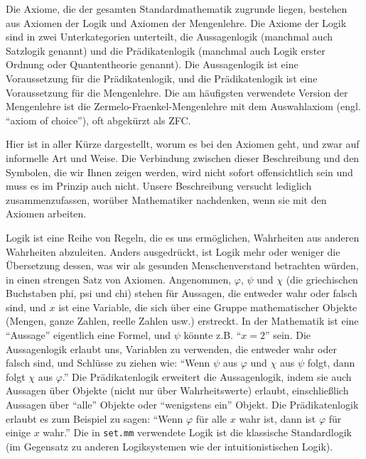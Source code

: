 Die Axiome, die der gesamten Standardmathematik zugrunde liegen, bestehen aus Axiomen der Logik und Axiomen der Mengenlehre. Die Axiome der Logik sind in zwei Unterkategorien unterteilt, die Aussagenlogik (manchmal auch Satzlogik genannt) und die Prädikatenlogik (manchmal auch Logik erster Ordnung oder Quantentheorie genannt).  Die Aussagenlogik ist eine Voraussetzung für die Prädikatenlogik, und die Prädikatenlogik ist eine Voraussetzung für die Mengenlehre.  Die am häufigsten verwendete Version der Mengenlehre ist die Zermelo-Fraenkel-Mengenlehre mit dem Auswahlaxiom (engl. "`axiom of choice"'), oft abgekürzt als ZFC.

Hier ist in aller Kürze dargestellt, worum es bei den Axiomen geht, und zwar auf informelle Art und Weise. Die Verbindung zwischen dieser Beschreibung und den Symbolen, die wir Ihnen zeigen werden, wird nicht sofort offensichtlich sein und muss es im Prinzip auch nicht.  Unsere Beschreibung versucht lediglich zusammenzufassen, worüber Mathematiker nachdenken, wenn sie mit den Axiomen arbeiten.

Logik ist eine Reihe von Regeln, die es uns ermöglichen, Wahrheiten aus anderen Wahrheiten abzuleiten. Anders ausgedrückt, ist Logik mehr oder weniger die Übersetzung dessen, was wir als gesunden Menschenverstand betrachten würden, in einen strengen Satz von Axiomen.  Angenommen, $\varphi$, $\psi$ und $\chi$ (die griechischen Buchstaben phi, psi und chi) stehen für Aussagen, die entweder wahr oder falsch sind, und $x$ ist eine Variable, die sich über eine Gruppe mathematischer Objekte (Mengen, ganze Zahlen, reelle Zahlen usw.) erstreckt. In der Mathematik ist eine "`Aussage"' eigentlich eine Formel, und $\psi$ könnte z.B. "`$x = 2$"' sein. Die Aussagenlogik erlaubt uns, Variablen zu verwenden, die entweder wahr oder falsch sind, und Schlüsse zu ziehen wie:
"`Wenn $\psi$ aus $\varphi$ und $\chi$  aus $\psi$ folgt, dann folgt $\chi$ aus $\varphi$."' Die Prädikatenlogik erweitert die Aussagenlogik, indem sie auch Aussagen über Objekte (nicht nur über Wahrheitswerte) erlaubt, einschließlich Aussagen über "`alle"' Objekte oder "`wenigstens ein"' Objekt. Die Prädikatenlogik erlaubt es zum Beispiel zu sagen: "`Wenn $\varphi$ für alle $x$ wahr ist, dann ist $\varphi$ für einige $x$ wahr."' Die in \texttt{set.mm} verwendete Logik ist die klassische Standardlogik (im Gegensatz zu anderen Logiksystemen wie der intuitionistischen Logik).


